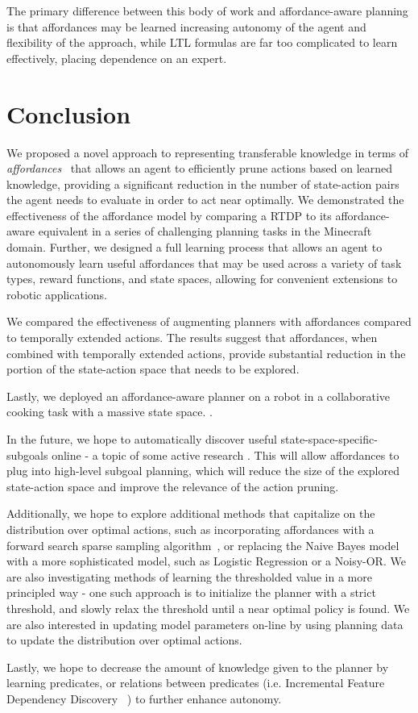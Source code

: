\documentclass[letterpaper]{article}
\newcommand{\dnote}[1]{\textcolor{Green}{\textbf{}}}
\newcommand{\enote}[1]{\textcolor{Red}{\textbf{}}}
\begin{document}
\enote{Maybe add how LTL is similar to what we are doing?}

The primary difference between this body of work and affordance-aware planning is that
affordances may be learned increasing autonomy of the agent and flexibility of the approach, while LTL formulas are far
too complicated to learn effectively, placing dependence on an expert.

\section{Conclusion}
\label{sec:conclusion}
\dnote{Conclusion could use some work/rewriting}
We proposed a novel approach to representing transferable knowledge in terms of
{\em affordances}~\cite{gibson77} that allows an agent to efficiently prune actions 
based on learned knowledge, providing a significant reduction in the number of state-action
pairs the agent needs to evaluate in order to act near optimally. We demonstrated the 
effectiveness of the affordance model by comparing a RTDP to its affordance-aware
equivalent in a series of challenging planning tasks in the Minecraft domain. Further, we designed
a full learning process that allows an agent to autonomously learn useful affordances that may be used
across a variety of task types, reward functions, and state spaces, allowing for convenient extensions 
to robotic applications.

We compared the effectiveness of augmenting planners with affordances compared to 
temporally extended actions. The results suggest that affordances, when combined with 
temporally extended actions, provide substantial reduction in the portion of the state-action 
space that needs to be explored.

Lastly, we deployed an affordance-aware planner on a robot in a collaborative cooking task with a massive 
state space. \dnote{Need to flesh out once we have more detail}.

In the future, we hope to automatically discover useful state-space-specific-subgoals online 
- a topic of some active research \cite{Mcgovern01automaticdiscovery,Simsek:2005:IUS:1102351.1102454}.
This will allow affordances to plug into high-level subgoal planning, which will reduce the size of the 
explored state-action space and improve the relevance of the action pruning. 

Additionally, we hope to explore additional methods that capitalize on the distribution over optimal actions,
such as incorporating affordances with a forward search sparse sampling algorithm~\cite{walsh2010integrating},
or replacing the Naive Bayes model with a more sophisticated model, such as Logistic Regression or a Noisy-OR.
We are also investigating methods of learning the thresholded value in a more principled way - one such
approach is to initialize the planner with a strict threshold, and slowly relax the threshold until a near optimal
policy is found. We are also interested in updating model parameters on-line by using planning data to update
the distribution over optimal actions. 

Lastly, we hope to decrease the amount of knowledge given to the planner by learning predicates, or relations between predicates (i.e. Incremental Feature Dependency Discovery ~\cite{ICML2011Geramifard_473}) to further enhance autonomy.

{\small


}
\end{document}
